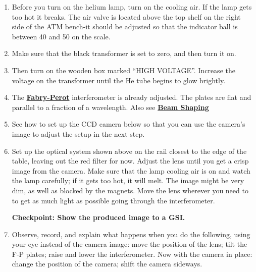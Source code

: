 \documentclass{../lab}
\begin{document}
\begin{enumerate}
    \item Before you turn on the helium lamp, turn on the cooling air. If the lamp gets too hot it breaks. The air valve is located above the top shelf on the right side of the ATM bench-it should be adjusted so that the indicator ball is between 40 and 50 on the scale.

    \item Make sure that the black transformer is set to zero, and then turn it on.

    \item Then turn on the wooden box marked ``HIGH VOLTAGE''. Increase the voltage on the transformer until the He tube begins to glow brightly.

    \item The \href{http://physics111.lib.berkeley.edu/Physics111/Reprints/ATM/OCR\%20Burleigh\%20tech\%20memo\%20fabry\%20perots.pdf}{\textbf{Fabry-Perot}} interferometer is already adjusted. The plates are flat and parallel to a fraction of a wavelength. Also see  \href{http://physics111.lib.berkeley.edu/Physics111/Reprints/ATM/Beam\%20Shaping.pdf}{\textbf{Beam Shaping}}

    \item See how to set up the CCD camera below so that you can use the camera's image to adjust the setup in the next step.

    \item Set up the optical system shown above on the rail closest to the edge of the table, leaving out the red filter for now. Adjust the lens until you get a crisp image from the camera. Make sure that the lamp cooling air is on and watch the lamp carefully; if it gets too hot, it will melt. The image might be very dim, as well as blocked by the magnets. Move the lens wherever you need to to get as much light as possible going through the interferometer.
    
    \textbf{Checkpoint: Show the produced image to a GSI.}

    \item Observe, record, and explain what happens when you do the following, using your eye instead of the camera image: move the position of the lens; tilt the F-P plates; raise and lower the interferometer. Now with the camera in place: change the position of the camera; shift the camera sideways.


\end{enumerate}
\end{document}
